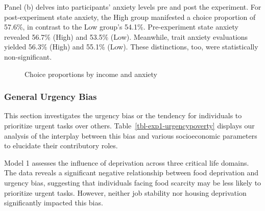 \documentclass[
]{article}
\begin{document}
Panel (b) delves into participants' anxiety levels pre and post the
experiment. For post-experiment state anxiety, the High group manifested
a choice proportion of 57.6\%, in contrast to the Low group's 54.1\%.
Pre-experiment state anxiety revealed 56.7\% (High) and 53.5\% (Low).
Meanwhile, trait anxiety evaluations yielded 56.3\% (High) and 55.1\%
(Low). These distinctions, too, were statistically non-significant.

\begin{figure}

\begin{minipage}[t]{0.50\linewidth}

{\centering 


}

\end{minipage}%
%
\begin{minipage}[t]{0.50\linewidth}

{\centering 


}

\end{minipage}%

\caption{\label{fig-exp1-tradeoff}Choice proportions by income and
anxiety}

\end{figure}

\hypertarget{general-urgency-bias-1}{%
\subsubsection{General Urgency Bias}\label{general-urgency-bias-1}}

This section investigates the urgency bias or the tendency for
individuals to prioritize urgent tasks over others.
Table~\ref{tbl-exp1-urgencypoverty} displays our analysis of the
interplay between this bias and various socioeconomic parameters to
elucidate their contributory roles.

Model 1 assesses the influence of deprivation across three critical life
domains. The data reveals a significant negative relationship between
food deprivation and urgency bias, suggesting that individuals facing
food scarcity may be less likely to prioritize urgent tasks. However,
neither job stability nor housing deprivation significantly impacted
this bias.
\end{document}

